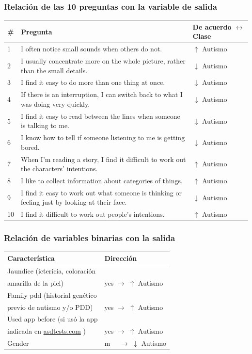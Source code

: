 \documentclass[12pt]{article}
\begin{document}
\subsubsection*{Relación de las 10 preguntas con la variable de salida}
\begin{longtable}{p{} p{} p{}}
\toprule
\# & Pregunta & De acuerdo $\leftrightarrow$ Clase \\
\midrule
1 & I often notice small sounds when others do not. & $\uparrow$ Autismo \\
2 & I usually concentrate more on the whole picture, rather than the small details. & $\downarrow$ Autismo \\
3 & I find it easy to do more than one thing at once. & $\downarrow$ Autismo \\
4 & If there is an interruption, I can switch back to what I was doing very quickly. &  $\downarrow$ Autismo \\
5 & I find it easy to read between the lines when someone is talking to me. & $\downarrow$ Autismo \\
6 & I know how to tell if someone listening to me is getting bored. & $\downarrow$ Autismo \\
7 & When I'm reading a story, I find it difficult to work out the characters' intentions. & $\uparrow$ Autismo \\
8 & I like to collect information about categories of things. &  $\uparrow$ Autismo \\
9 & I find it easy to work out what someone is thinking or feeling just by looking at their face. & $\downarrow$ Autismo \\
10 & I find it difficult to work out people's intentions. & $\uparrow$ Autismo \\
\bottomrule
\end{longtable}

\subsubsection*{Relación de variables binarias con la salida}
\begin{longtable}{p{} p{}}
\toprule
Característica & Dirección \\
\midrule
Jaundice (ictericia, coloración \\ amarilla de la piel) & yes $\rightarrow$ $\uparrow$ Autismo \\
Family pdd (historial genético \\ previo de autismo y/o PDD) & yes $\rightarrow$ $\uparrow$ Autismo \\
Used app before (si usó la app \\ indicada en \href{https://asdtests.com}{asdtests.com} \cite{asdtests}) & yes $\rightarrow$ $\uparrow$ Autismo \\
Gender & m \ \ $\rightarrow$ $\downarrow$ Autismo \\
\bottomrule
\end{longtable}
\end{document}

